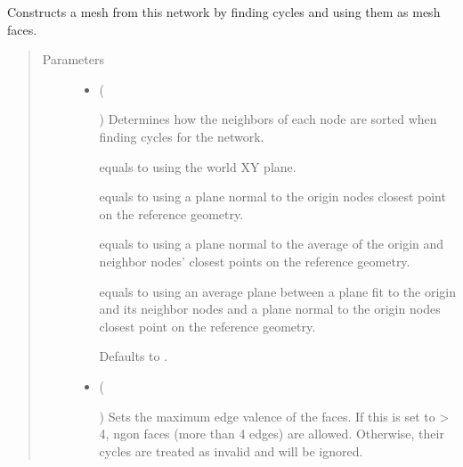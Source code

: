 \documentclass[letterpaper,10pt,english]{sphinxmanual}
\begin{document}
\begin{fulllineitems}
\begin{fulllineitems}
\label{\detokenize{cockatoo:cockatoo.KnitNetwork.create_mesh}}
Constructs a mesh from this network by finding cycles and using them as
mesh faces.
\begin{quote}\begin{description}
\item[{Parameters}] \leavevmode\begin{itemize}
\item {} 
 (%
\begin{footnote}[127]\sphinxAtStartFootnote
{}
%
\end{footnote}\sphinxstyleliteralemphasis{\sphinxupquote{, }}) \textendash{} 
Determines how the neighbors of each node are sorted when finding
cycles for the network.

 equals to using the world XY plane.

 equals to using a plane normal to the origin nodes closest
point on the reference geometry.

 equals to using a plane normal to the average of the origin
and neighbor nodes’ closest points on the reference geometry.

 equals to using an average plane between a plane fit to the
origin and its neighbor nodes and a plane normal to the origin
nodes closest point on the reference geometry.

Defaults to .


\item {} 
 (%
\begin{footnote}[128]\sphinxAtStartFootnote
{}
%
\end{footnote}\sphinxstyleliteralemphasis{\sphinxupquote{, }}) \textendash{} 
Sets the maximum edge valence of the faces. If this is set to \textgreater{} 4,
n\sphinxhyphen{}gon faces (more than 4 edges) are allowed. Otherwise, their
cycles are treated as invalid and will be ignored.


\end{itemize}
\end{description}
\end{quote}
\end{fulllineitems}
\end{fulllineitems}
\end{document}
